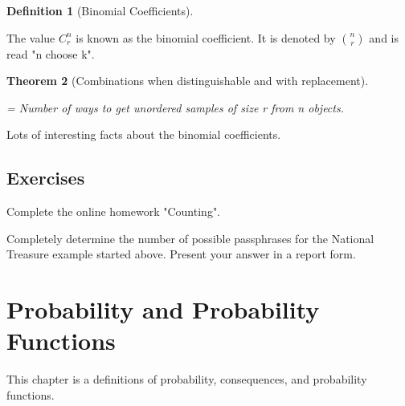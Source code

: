\documentclass[10pt,]{book}
\theoremstyle{plain}
\newtheorem{theorem}{Theorem}[section]
\theoremstyle{definition}
\newtheorem{definition}[theorem]{Definition}
\theoremstyle{definition}
\numberwithin{equation}{section}
\begin{document}
\begin{definition}[Binomial Coefficients]\label{definition-19}

		The value \(C_r^n\) is known as the binomial coefficient. It is
		denoted by \({n \choose r}\) and is read "n choose k".
\end{definition}
\begin{theorem}[Combinations when distinguishable and with replacement]\label{theorem-15}

	= Number of ways to get unordered samples of size r from n objects. 
	\end{theorem}
\par
Lots of interesting facts about the binomial coefficients.%
\typeout{************************************************}
\typeout{************************************************}
\section[Exercises]{Exercises}\label{section-16}
Complete the online homework "Counting".%
\par
Completely determine the number of possible passphrases for the National Treasure example started above. Present your answer in a report form.%
\typeout{************************************************}
\typeout{************************************************}
\chapter[Probability and Probability Functions]{Probability and Probability Functions}\label{ProbabilityGeneralities}
\typeout{************************************************}
\typeout{************************************************}
This chapter is a definitions of probability, consequences, and probability functions.%
\typeout{************************************************}
\typeout{************************************************}
\end{document}

